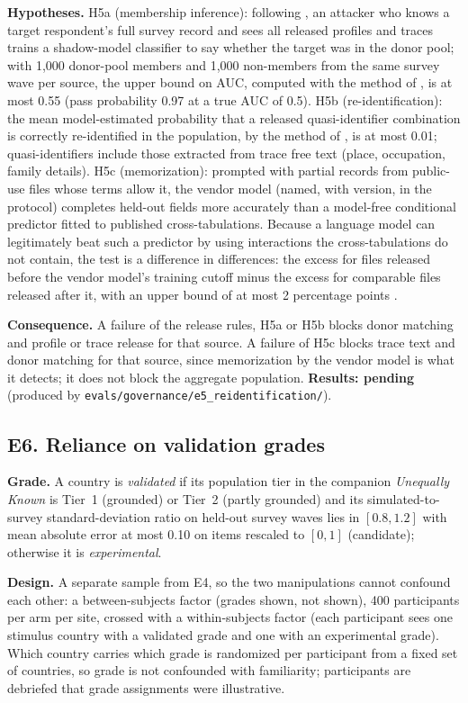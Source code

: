 \documentclass[11pt]{article}
\newcommand{\pending}[1]{\textbf{Results: pending} (produced by \nolinkurl{#1}).}
\begin{document}
\textbf{Hypotheses.} H5a (membership inference): following \citet{stadler2022groundhog}, an attacker who knows a target respondent's full survey record and sees all released profiles and traces trains a shadow-model classifier to say whether the target was in the donor pool; with 1,000 donor-pool members and 1,000 non-members from the same survey wave per source, the upper bound on AUC, computed with the method of \citet{delong1988auc}, is at most 0.55 (pass probability 0.97 at a true AUC of 0.5). H5b (re-identification): the mean model-estimated probability that a released quasi-identifier combination is correctly re-identified in the population, by the method of \citet{rocher2019reidentification}, is at most 0.01; quasi-identifiers include those extracted from trace free text (place, occupation, family details). H5c (memorization): prompted with partial records from public-use files whose terms allow it, the vendor model (named, with version, in the protocol) completes held-out fields more accurately than a model-free conditional predictor fitted to published cross-tabulations. Because a language model can legitimately beat such a predictor by using interactions the cross-tabulations do not contain, the test is a difference in differences: the excess for files released before the vendor model's training cutoff minus the excess for comparable files released after it, with an upper bound of at most 2 percentage points \citep{carlini2021extracting}.

\textbf{Consequence.} A failure of the release rules, H5a or H5b blocks donor matching and profile or trace release for that source. A failure of H5c blocks trace text and donor matching for that source, since memorization by the vendor model is what it detects; it does not block the aggregate population.
\pending{evals/governance/e5_reidentification/}

\subsection{E6. Reliance on validation grades}
\label{app:e6}
\textbf{Grade.} A country is \emph{validated} if its population tier in the companion \emph{Unequally Known} is Tier~1 (grounded) or Tier~2 (partly grounded) and its simulated-to-survey standard-deviation ratio on held-out survey waves lies in $[0.8, 1.2]$ with mean absolute error at most 0.10 on items rescaled to $[0,1]$ (candidate); otherwise it is \emph{experimental}.

\textbf{Design.} A separate sample from E4, so the two manipulations cannot confound each other: a between-subjects factor (grades shown, not shown), 400 participants per arm per site, crossed with a within-subjects factor (each participant sees one stimulus country with a validated grade and one with an experimental grade). Which country carries which grade is randomized per participant from a fixed set of countries, so grade is not confounded with familiarity; participants are debriefed that grade assignments were illustrative.
\end{document}
